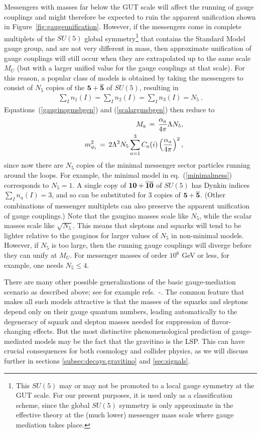 \documentclass[11pt]{article}
\def\beq{\begin{eqnarray}}
\def\eeq{\end{eqnarray}}
\def\nmess{N_5}
\begin{document}
Messengers with masses far below the GUT scale will affect the running of 
gauge couplings and might therefore be expected to ruin the apparent 
unification shown in Figure~\ref{fig:gaugeunification}. However, if the 
messengers come in complete multiplets of the $SU(5)$ global 
symmetry\footnote{This $SU(5)$ may or may not be promoted to a local gauge 
symmetry at the GUT scale. For our present purposes, it is used only as 
a classification scheme, since the global $SU(5)$ symmetry is only 
approximate in the effective theory at the (much lower) messenger mass 
scale where gauge mediation takes place.} that contains the Standard Model 
gauge group, and are not very different in mass, then approximate 
unification of gauge couplings will still occur when they are extrapolated 
up to the same scale $M_U$ (but with a larger unified value for the gauge 
couplings at that scale). For this reason, a popular class of models is 
obtained by taking the messengers to consist of $\nmess$ copies of the 
${\bf 5}+{\bf \overline 5}$ of $SU(5)$, resulting in
\beq
\sum_I n_1(I) = \sum_I n_2(I) =\sum_I n_3(I) = \nmess\> .
\eeq  
Equations~(\ref{gauginogmsbgen}) and
(\ref{scalargmsbgen}) then reduce to 
\beq
&&M_a \,=\, {\alpha_a \over 4 \pi} \Lambda \nmess ,
\label{gmsbgauginonmess}\\
&&m^2_{\phi_i} \,=\, 2 \Lambda^2 \nmess
\sum_{a=1}^3 C_a(i) \left ({\alpha_a\over 4\pi}\right )^2 ,
\label{gmsbnmess}
\eeq
since now there are $\nmess$ copies of the minimal messenger sector 
particles running around the loops. For example, the minimal model in 
eq.~(\ref{minimalmess}) corresponds to $\nmess = 1$. A single copy of 
${\bf 10} + {\bf \overline{ 10}}$ of $SU(5)$ has Dynkin indices $\sum_I 
n_a(I) = 3$, and so can be substituted for 3 copies of ${\bf 5}+{\bf 
\overline 5}$. (Other combinations of messenger multiplets can also 
preserve the apparent unification of gauge couplings.) Note that the 
gaugino masses scale like $\nmess$, while the scalar masses scale like 
$\sqrt{\nmess}$. This means that sleptons and squarks will tend to be 
lighter relative to the gauginos for larger values of $\nmess$ in 
non-minimal models. However, if $\nmess$ is too large, then the running 
gauge couplings will diverge before they can unify at $M_U$. For messenger 
masses of order $10^6$ GeV or less, for example, one needs $\nmess\leq 4$.

There are many other possible generalizations of the basic gauge-mediation 
scenario as described above; see for example 
refs.~\cite{gmsbcorrB}-\cite{GGMb}. The common feature that makes all such models 
attractive is that the masses of the squarks and sleptons depend only on 
their gauge quantum numbers, leading automatically to the degeneracy of 
squark and slepton masses needed for suppression of flavor-changing 
effects. But the most distinctive phenomenological prediction of 
gauge-mediated models may be the fact that the gravitino is the LSP. This 
can have crucial consequences for both cosmology and collider physics, as 
we will discuss further in sections \ref{subsec:decays.gravitino} and 
\ref{sec:signals}.
\end{document}
